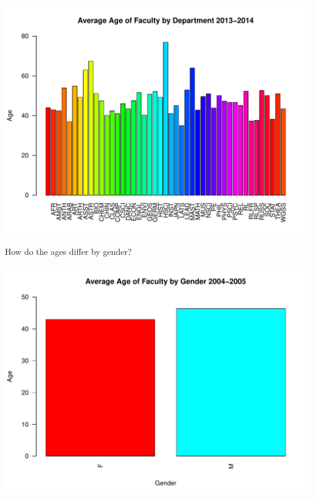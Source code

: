 \documentclass[12pt,a4paper]{article}\usepackage[]{graphicx}\usepackage[]{color}
\makeatletter
\def\maxwidth{ %
  \ifdim\Gin@nat@width>\linewidth
    \linewidth
  \else
    \Gin@nat@width
  \fi
}
\newenvironment{knitrout}{}{} %
\theoremstyle{definition}
\makeatother
\begin{document}
\begin{knitrout}
\includegraphics[width=\maxwidth]{figure/unnamed-chunk-10-10} 

\end{knitrout}

\bigksip\noindent
How do the ages differ by gender?

\begin{knitrout}
\color{fgcolor}
\includegraphics[width=\maxwidth]{figure/unnamed-chunk-11-1} 

\end{knitrout}
\end{document}
